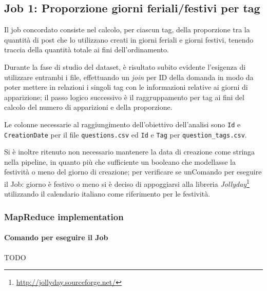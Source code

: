 

\subsection{Job 1: Proporzione giorni feriali/festivi per tag}\label{subsec:job1}
  Il job concordato consiste nel calcolo, per ciascun tag, della proporzione tra la quantità di post che lo utilizzano creati in giorni feriali e giorni festivi, tenendo traccia della quantità totale ai fini dell'ordinamento.

  Durante la fase di studio del dataset, è risultato subito evidente l'esigenza di utilizzare entrambi i file, effettuando un \textit{join} per ID della domanda in modo da poter mettere in relazioni i singoli tag con le informazioni relative ai giorni di apparizione;
  il passo logico successivo è il raggruppamento per tag ai fini del calcolo del numero di apparizioni e della proporzione.

  Le colonne necessarie al raggiungimento dell'obiettivo dell'analisi sono \texttt{Id} e \texttt{CreationDate} per il file \texttt{questions.csv} ed \texttt{Id} e \texttt{Tag} per \texttt{question\_tags.csv}.

  Si è inoltre ritenuto non necessario mantenere la data di creazione come stringa nella pipeline, in quanto più che sufficiente un booleano che modellasse la festività o meno del giorno di creazione;
  per verificare se unComando per eseguire il Job: giorno è festivo o meno si è deciso di appoggiarsi alla libreria \textit{Jollyday}\footnote{\url{http://jollyday.sourceforge.net/}} utilizzando il calendario italiano come riferimento per le festività.

  \subsubsection{MapReduce implementation}\label{subsub:job1:mapreduce}

  \paragraph{Comando per eseguire il Job}\label{par:job1:mapreduce:cmd}

  TODO


